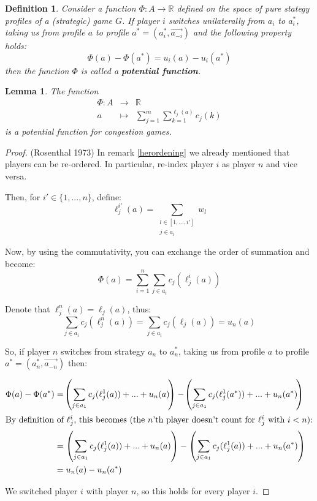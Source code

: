 \documentclass[a4paper,11pt]{article}
\newtheorem{lemma}[theorem]{Lemma}
\newtheorem{definition}[theorem]{Definition}
\newcommand{\R}{{\mathbb R}}
\begin{document}
\begin{definition}
Consider a function $\Phi: A \rightarrow \R$  defined on the space of pure stategy profiles of a (strategic) game $G$. If player $i$ switches unilaterally from $a_i$ to $a_i^*$, taking us from profile $a$ to profile $a^*=(a_i^*, \vec{a_{-i}})$ and the following property holds:
$$\Phi(a) - \Phi(a^*) = u_i(a) - u_i(a^*) $$
then the function $\Phi$ is called a \textbf{potential function}.
\end{definition}



\begin{lemma}
The function
\begin{eqnarray*}
\Phi: A &\rightarrow& \R\\
a &\mapsto& \displaystyle\sum_{j=1}^{m}\displaystyle\sum_{k=1}^{\ell_j(a)} c_j(k)
\end{eqnarray*}
is a potential function for congestion games.
\end{lemma}

\begin{proof}(Rosenthal 1973)\cite{7,8}
In remark \ref{herordening} we already mentioned that players can be re-ordered. In particular, re-index player $i$ as player $n$ and vice versa.

Then, for $i' \in \{1,...,n\}$, define:
$$\ell_j^{i'}(a) = \displaystyle\sum_{\substack{l \in [1,...,i']\\j \in a_l}}{w_l} $$

Now, by using the commutativity, you can exchange the order of summation and become:
$$\Phi(a) = \displaystyle\sum_{i=1}^{n}\displaystyle\sum_{j\in a_i} c_j(\ell_j^i(a))$$

Denote that $\ell_j^n(a) = \ell_j(a)$, thus:
$$\displaystyle\sum_{j\in a_i} c_j(\ell_j^n(a)) = \displaystyle\sum_{j\in a_i} c_j(\ell_j(a)) = u_n(a)$$

So, if player $n$ switches from strategy $a_n$ to $a_n^*$, taking us from profile $a$ to profile $a^*=(a_n^*, \vec{a_{-n}})$ then:

\begin{align*}
\Phi(a) - \Phi(a^*) &= \!\left(\sum_{j\in a_1} c_j(\ell_j^1(a)) + ... + u_n(a) \!\right) - \!\left(\sum_{j\in a_1} c_j(\ell_j^1(a^*)) + ... + u_n(a^*) \!\right)\\
\intertext{By definition of $\ell_j^i$, this becomes (the $n$'th player doesn't count for $\ell_j^i$ with $i < n$):}
&= \left(\sum_{j\in a_1} c_j(\ell_j^1(a)) + ... + u_n(a) \right) - \left(\sum_{j\in a_1} c_j(\ell_j^1(a)) + ... + u_n(a^*) \right)\\
&= u_n(a) - u_n(a^*)
\end{align*}

We switched player $i$ with player $n$, so this holds for every player $i$.

\end{proof}
\end{document}
